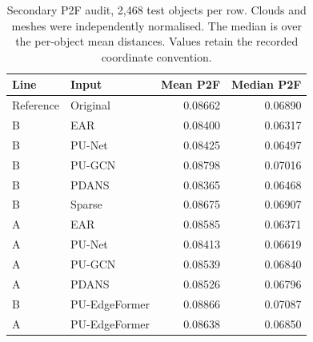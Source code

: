 \begin{table}[!t]\centering
\begin{tabular}{llrr}\toprule Line & Input & Mean P2F & Median P2F\\\midrule
Reference & Original & 0.08662 & 0.06890 \\
B & EAR & 0.08400 & 0.06317 \\
B & PU-Net & 0.08425 & 0.06497 \\
B & PU-GCN & 0.08798 & 0.07016 \\
B & PDANS & 0.08365 & 0.06468 \\
B & Sparse & 0.08675 & 0.06907 \\
A & EAR & 0.08585 & 0.06371 \\
A & PU-Net & 0.08413 & 0.06619 \\
A & PU-GCN & 0.08539 & 0.06840 \\
A & PDANS & 0.08526 & 0.06796 \\
B & PU-EdgeFormer & 0.08866 & 0.07087 \\
A & PU-EdgeFormer & 0.08638 & 0.06850 \\
\bottomrule\end{tabular}
\caption{Secondary P2F audit, 2,468 test objects per row. Clouds and meshes were independently normalised. The median is over the per-object mean distances. Values retain the recorded coordinate convention.}\label{tab:p2f-audit}\end{table}

